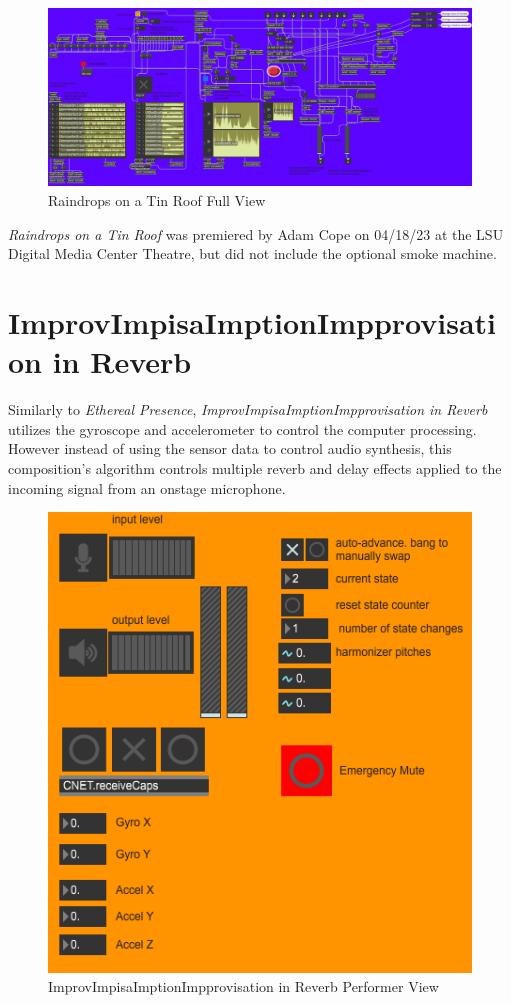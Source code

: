 \begin{figure}
    \centering
    \includegraphics[scale=0.6]{diagrams/maxPatches/raindropsRaw.png}
    \caption{Raindrops on a Tin Roof Full View}
    \label{fig:raindropsRaw}
\end{figure}

\textit{Raindrops on a Tin Roof} was premiered by Adam Cope on 04/18/23 at the LSU Digital Media Center Theatre, but did not include the optional smoke machine.

\section{ImprovImpisaImptionImpprovisation in Reverb}
Similarly to \textit{Ethereal Presence}, \textit{ImprovImpisaImptionImpprovisation in Reverb} utilizes the gyroscope and accelerometer to control the computer processing. However instead of using the sensor data to control audio synthesis, this composition's algorithm controls multiple reverb and delay effects applied to the incoming signal from an onstage microphone.

\begin{figure}
    \centering
    \includegraphics{diagrams/maxPatches/imporvPres.png}
    \caption{ImprovImpisaImptionImpprovisation in Reverb Performer View}
    \label{fig:ImprovPres}
\end{figure}

